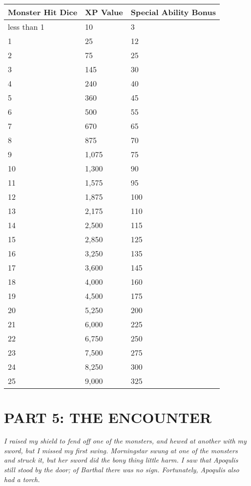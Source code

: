 \documentclass[a4paper,twoside,openany,10pt]{book}
\begin{document}
\begin{multicols}{2}
\begin{tabular*}{0.93\linewidth}{@{\extracolsep{\fill}}lll}
\textbf{Monster Hit Dice} & \textbf{XP Value} & \textbf{Special Ability Bonus}\\\toprule
less than 1 & 10 & 3 \\\hline
1 & 25 & 12 \\\hline
2 & 75 & 25 \\\hline
3 & 145 & 30 \\\hline
4 & 240 & 40 \\\hline
5 & 360 & 45 \\\hline
6 & 500 & 55 \\\hline
7 & 670 & 65 \\\hline
8 & 875 & 70 \\\hline
9 & 1,075 & 75 \\\hline
10 & 1,300 & 90 \\\hline
11 & 1,575 & 95 \\\hline
12 & 1,875 & 100 \\\hline
13 & 2,175 & 110 \\\hline
14 & 2,500 & 115 \\\hline
15 & 2,850 & 125 \\\hline
16 & 3,250 & 135 \\\hline
17 & 3,600 & 145 \\\hline
18 & 4,000 & 160 \\\hline
19 & 4,500 & 175 \\\hline
20 & 5,250 & 200 \\\hline
21 & 6,000 & 225 \\\hline
22 & 6,750 & 250 \\\hline
23 & 7,500 & 275 \\\hline
24 & 8,250 & 300 \\\hline
25 & 9,000 & 325 \\\bottomrule
\end{tabular*}


\end{multicols}
\pagebreak

\section{PART 5: THE ENCOUNTER}\label{part-5-the-encounter}

\textit{I raised my shield to fend off one of the monsters, and hewed at another with my sword, but I missed my first swing. Morningstar swung at one of the monsters and struck it, but her sword did the bony thing little harm. I saw that Apoqulis still stood by the door; of Barthal there was no sign. Fortunately, Apoqulis also had a torch.}
\end{document}
